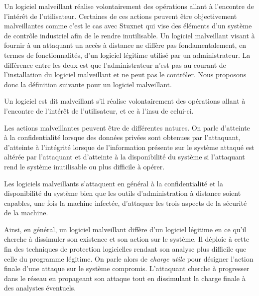 Un logiciel malveillant réalise volontairement des opérations allant à l'encontre de l'intérêt de l'utilisateur. 
Certaines de ces actions peuvent être objectivement malveillantes comme c'est le cas avec Stuxnet qui vise des éléments d'un système de contrôle industriel afin de le rendre inutilisable. 
Un logiciel malveillant visant à fournir à un attaquant un accès à distance ne diffère pas fondamentalement, en termes de fonctionnalités, d'un logiciel légitime utilisé par un administrateur.
La différence entre les deux est que l'administrateur n'est pas au courant de l'installation du logiciel malveillant et ne peut pas le contrôler.
Nous proposons donc la définition suivante pour un logiciel malveillant.
\begin{defi}
Un logiciel est dit malveillant s'il réalise volontairement des opérations allant à l'encontre de l'intérêt de l'utilisateur, et ce à l'insu de celui-ci.
\end{defi}

Les actions malveillantes peuvent être de différentes natures. On parle d'atteinte à la confidentialité lorsque des données privées sont obtenues par l'attaquant, d'atteinte à l'intégrité lorsque de l'information présente sur le système attaqué est altérée par l'attaquant et d'atteinte à la disponibilité du système si l'attaquant rend le système inutilisable ou plus difficile à opérer.

Les logiciels malveillants s'attaquent en général à la confidentialité et la disponibilité du système bien que les outils d'administration à distance soient capables, une fois la machine infectée, d'attaquer les trois aspects de la sécurité de la machine.

Ainsi, en général, un logiciel malveillant diffère d'un logiciel légitime en ce qu'il cherche à dissimuler son existence et son action sur le système. Il déploie à cette fin des techniques de protection logicielles rendant son analyse plus difficile que celle du programme légitime.
On parle alors de \emph{charge utile} pour désigner l'action finale d'une attaque sur le système compromis. L'attaquant cherche à progresser dans le réseau en propageant son attaque tout en dissimulant la charge finale à des analystes éventuels.


